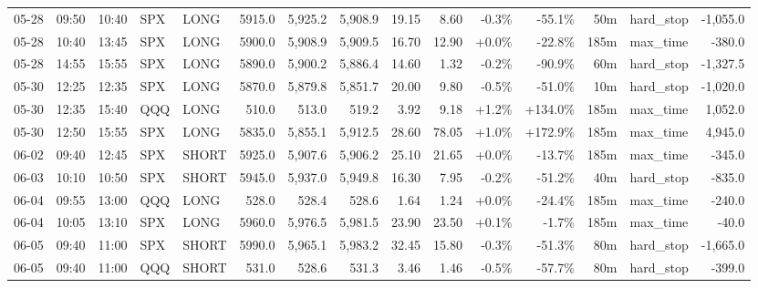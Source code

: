 \documentclass[11pt,a4paper,twoside]{article}
\begin{document}
\begin{landscape}
\begin{center}
\begin{longtable}{>{\color{txtmain}}l l l l l r r r r r r r r >{\color{txtmain}}l r}
05-28 & 09:50 & 10:40 & SPX & LONG & 5915.0 & 5,925.2 & 5,908.9 & 19.15 & 8.60 & \textcolor{lossred}{-0.3\%} & \textcolor{lossred}{-55.1\%} & 50m & hard\_stop & \textcolor{lossred}{-1,055.0} \\
05-28 & 10:40 & 13:45 & SPX & LONG & 5900.0 & 5,908.9 & 5,909.5 & 16.70 & 12.90 & \textcolor{wingreen}{+0.0\%} & \textcolor{lossred}{-22.8\%} & 185m & max\_time & \textcolor{lossred}{-380.0} \\
05-28 & 14:55 & 15:55 & SPX & LONG & 5890.0 & 5,900.2 & 5,886.4 & 14.60 & 1.32 & \textcolor{lossred}{-0.2\%} & \textcolor{lossred}{-90.9\%} & 60m & hard\_stop & \textcolor{lossred}{-1,327.5} \\
05-30 & 12:25 & 12:35 & SPX & LONG & 5870.0 & 5,879.8 & 5,851.7 & 20.00 & 9.80 & \textcolor{lossred}{-0.5\%} & \textcolor{lossred}{-51.0\%} & 10m & hard\_stop & \textcolor{lossred}{-1,020.0} \\
05-30 & 12:35 & 15:40 & QQQ & LONG & 510.0 & 513.0 & 519.2 & 3.92 & 9.18 & \textcolor{wingreen}{+1.2\%} & \textcolor{wingreen}{+134.0\%} & 185m & max\_time & \textcolor{wingreen}{1,052.0} \\
05-30 & 12:50 & 15:55 & SPX & LONG & 5835.0 & 5,855.1 & 5,912.5 & 28.60 & 78.05 & \textcolor{wingreen}{+1.0\%} & \textcolor{wingreen}{+172.9\%} & 185m & max\_time & \textcolor{wingreen}{4,945.0} \\
06-02 & 09:40 & 12:45 & SPX & SHORT & 5925.0 & 5,907.6 & 5,906.2 & 25.10 & 21.65 & \textcolor{wingreen}{+0.0\%} & \textcolor{lossred}{-13.7\%} & 185m & max\_time & \textcolor{lossred}{-345.0} \\
06-03 & 10:10 & 10:50 & SPX & SHORT & 5945.0 & 5,937.0 & 5,949.8 & 16.30 & 7.95 & \textcolor{lossred}{-0.2\%} & \textcolor{lossred}{-51.2\%} & 40m & hard\_stop & \textcolor{lossred}{-835.0} \\
06-04 & 09:55 & 13:00 & QQQ & LONG & 528.0 & 528.4 & 528.6 & 1.64 & 1.24 & \textcolor{wingreen}{+0.0\%} & \textcolor{lossred}{-24.4\%} & 185m & max\_time & \textcolor{lossred}{-240.0} \\
06-04 & 10:05 & 13:10 & SPX & LONG & 5960.0 & 5,976.5 & 5,981.5 & 23.90 & 23.50 & \textcolor{wingreen}{+0.1\%} & \textcolor{lossred}{-1.7\%} & 185m & max\_time & \textcolor{lossred}{-40.0} \\
06-05 & 09:40 & 11:00 & SPX & SHORT & 5990.0 & 5,965.1 & 5,983.2 & 32.45 & 15.80 & \textcolor{lossred}{-0.3\%} & \textcolor{lossred}{-51.3\%} & 80m & hard\_stop & \textcolor{lossred}{-1,665.0} \\
06-05 & 09:40 & 11:00 & QQQ & SHORT & 531.0 & 528.6 & 531.3 & 3.46 & 1.46 & \textcolor{lossred}{-0.5\%} & \textcolor{lossred}{-57.7\%} & 80m & hard\_stop & \textcolor{lossred}{-399.0} \\

\end{longtable}
\end{center}
\end{landscape}
\end{document}
